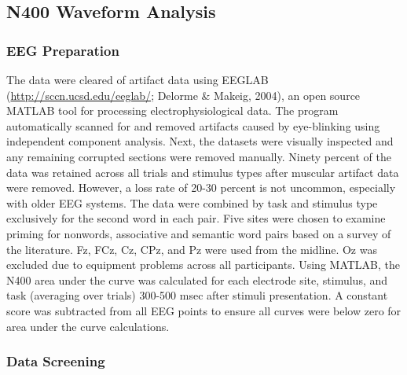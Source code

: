 \documentclass[english,man]{apa6}
\theoremstyle{definition}
\theoremstyle{definition}
\theoremstyle{definition}
\theoremstyle{remark}
\begin{document}
\subsection{N400 Waveform Analysis}\label{n400-waveform-analysis}

\subsubsection{EEG Preparation}\label{eeg-preparation}

The data were cleared of artifact data using EEGLAB
(\url{http://sccn.ucsd.edu/eeglab/}; Delorme \& Makeig, 2004), an open
source MATLAB tool for processing electrophysiological data. The program
automatically scanned for and removed artifacts caused by eye-blinking
using independent component analysis. Next, the datasets were visually
inspected and any remaining corrupted sections were removed manually.
Ninety percent of the data was retained across all trials and stimulus
types after muscular artifact data were removed. However, a loss rate of
20-30 percent is not uncommon, especially with older EEG systems. The
data were combined by task and stimulus type exclusively for the second
word in each pair. Five sites were chosen to examine priming for
nonwords, associative and semantic word pairs based on a survey of the
literature. Fz, FCz, Cz, CPz, and Pz were used from the midline. Oz was
excluded due to equipment problems across all participants. Using
MATLAB, the N400 area under the curve was calculated for each electrode
site, stimulus, and task (averaging over trials) 300-500 msec after
stimuli presentation. A constant score was subtracted from all EEG
points to ensure all curves were below zero for area under the curve
calculations.

\subsubsection{Data Screening}\label{data-screening}
\end{document}
